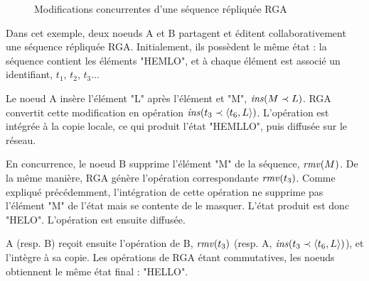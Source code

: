 \begin{figure}[!ht]
{
  }
  \caption{Modifications concurrentes d'une séquence répliquée \ac{RGA}}
  \label{fig:rga}
\end{figure}

Dans cet exemple, deux noeuds A et B partagent et éditent collaborativement une séquence répliquée \ac{RGA}.
Initialement, ils possèdent le même état : la séquence contient les éléments "HEMLO", et à chaque élément est associé un identifiant, \eg $t_1$, $t_2$, $t_3$...

Le noeud A insère l'élément "L" après l'élément et "M", \ie $\mathit{ins}(M \prec L)$.
RGA convertit cette modification en opération $\mathit{ins}(t_3 \prec \langle t_6,L \rangle)$.
L'opération est intégrée à la copie locale, ce qui produit l'état "HEMLLO", puis diffusée sur le réseau.

En concurrence, le noeud B supprime l'élément "M" de la séquence, \ie $\mathit{rmv}(M)$.
De la même manière, \ac{RGA} génère l'opération correspondante $\mathit{rmv}(t_3)$.
Comme expliqué précédemment, l'intégration de cette opération ne supprime pas l'élément "M" de l'état mais se contente de le masquer.
L'état produit est donc "HELO".
L'opération est ensuite diffusée.

A (resp. B) reçoit ensuite l'opération de B, $\mathit{rmv}(t_3)$ (resp. A, $\mathit{ins}(t_3 \prec \langle t_6,L \rangle)$), et l'intègre à sa copie.
Les opérations de \ac{RGA} étant commutatives, les noeuds obtiennent le même état final : "HELLO".


